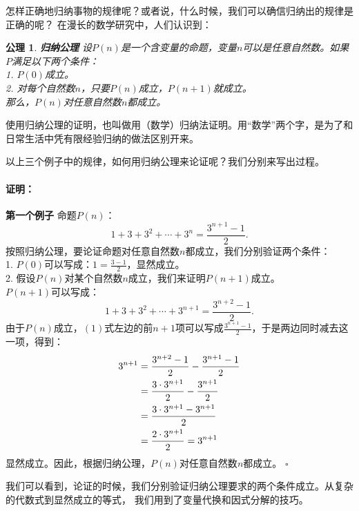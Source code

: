 \documentclass[12pt,UTF8]{ctexbook}
\newtheorem{po}{公理}
\newenvironment{proof2}{\paragraph{\textbf{证明：}}}{\hfill$\square$}
\begin{document}
怎样正确地归纳事物的规律呢？或者说，什么时候，我们可以确信归纳出的规律是正确的呢？
在漫长的数学研究中，人们认识到：
\begin{po}{\textbf{归纳公理}}
    设$P(n)$是一个含变量的命题，变量$n$可以是任意自然数。如果$P$满足以下两个条件：\\
    1. $P(0)$成立。\\
    2. 对每个自然数$n$，只要$P(n)$成立，$P(n+1)$就成立。\\
    那么，$P(n)$对任意自然数$n$都成立。
\end{po}
使用归纳公理的证明，也叫做用（数学）归纳法证明。用“数学”两个字，是为了和日常生活中凭有限经验归纳的做法区别开来。

以上三个例子中的规律，如何用归纳公理来论证呢？我们分别来写出过程。
\begin{proof2}{\textbf{第一个例子 }}
    命题$P(n)$：
    $$ 1 + 3 + 3^2 + \cdots + 3^n = \frac{3^{n+1} - 1}{2}. $$
    按照归纳公理，要论证命题对任意自然数$n$都成立，我们分别验证两个条件：\\
    1. $P(0)$可以写成：$1 = \frac{3 - 1}{2}$，显然成立。\\
    2. 假设$P(n)$对某个自然数$n$成立，我们来证明$P(n+1)$成立。\\
    $P(n+1)$可以写成：
    $$ 1 + 3 + 3^2 + \cdots + 3^{n+1} = \frac{3^{n+2} - 1}{2}. $$
    由于$P(n)$成立，$(1)$式左边的前$n+1$项可以写成$\frac{3^{n+1} - 1}{2}$，于是两边同时减去这一项，得到：
    \begin{align}
        3^{n+1} &= \frac{3^{n+2} - 1}{2} - \frac{3^{n+1} - 1}{2} \notag \\
        &= \frac{3\cdot 3^{n+1}}{2} - \frac{3^{n+1}}{2} \notag \\
        &= \frac{3\cdot 3^{n+1} - 3^{n+1}}{2} \notag \\
        &= \frac{2 \cdot 3^{n+1}}{2} = 3^{n+1} \notag
    \end{align}
    显然成立。因此，根据归纳公理，$P(n)$对任意自然数$n$都成立。    
\end{proof2}

我们可以看到，论证的时候，我们分别验证归纳公理要求的两个条件成立。从复杂的代数式到显然成立的等式，
我们用到了变量代换和因式分解的技巧。
\end{document}
